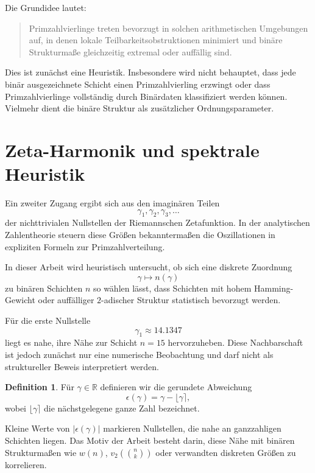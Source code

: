 \documentclass[11pt,a4paper,twocolumn]{article}
\theoremstyle{definition}
\newtheorem{definition}{Definition}
\theoremstyle{remark}
\begin{document}
	Die Grundidee lautet:
	\begin{quote}
		Primzahlvierlinge treten bevorzugt in solchen arithmetischen Umgebungen auf, in denen lokale Teilbarkeitsobstruktionen minimiert und binäre Strukturmaße gleichzeitig extremal oder auffällig sind.
	\end{quote}
	
	Dies ist zunächst eine Heuristik. Insbesondere wird nicht behauptet, dass jede binär ausgezeichnete Schicht einen Primzahlvierling erzwingt oder dass Primzahlvierlinge vollständig durch Binärdaten klassifiziert werden können. Vielmehr dient die binäre Struktur als zusätzlicher Ordnungsparameter.
	
	\section{Zeta-Harmonik und spektrale Heuristik}
	Ein zweiter Zugang ergibt sich aus den imaginären Teilen
	\[
	\gamma_1,\gamma_2,\gamma_3,\dots
	\]
	der nichttrivialen Nullstellen der Riemannschen Zetafunktion. In der analytischen Zahlentheorie steuern diese Größen bekanntermaßen die Oszillationen in expliziten Formeln zur Primzahlverteilung.
	
	In dieser Arbeit wird heuristisch untersucht, ob sich eine diskrete Zuordnung
	\[
	\gamma \longmapsto n(\gamma)
	\]
	zu binären Schichten $n$ so wählen lässt, dass Schichten mit hohem Hamming-Gewicht oder auffälliger $2$-adischer Struktur statistisch bevorzugt werden.
	
	Für die erste Nullstelle
	\[
	\gamma_1 \approx 14.1347
	\]
	liegt es nahe, ihre Nähe zur Schicht $n=15$ hervorzuheben. Diese Nachbarschaft ist jedoch zunächst nur eine numerische Beobachtung und darf nicht als struktureller Beweis interpretiert werden.
	
	\begin{definition}
		Für $\gamma\in\mathbb{R}$ definieren wir die gerundete Abweichung
		\begin{equation}
			\epsilon(\gamma)=\gamma-\lfloor \gamma \rceil,
		\end{equation}
		wobei $\lfloor \gamma \rceil$ die nächstgelegene ganze Zahl bezeichnet.
	\end{definition}
	
	Kleine Werte von $|\epsilon(\gamma)|$ markieren Nullstellen, die nahe an ganzzahligen Schichten liegen. Das Motiv der Arbeit besteht darin, diese Nähe mit binären Strukturmaßen wie $w(n)$, $v_2\!\left(\binom{n}{k}\right)$ oder verwandten diskreten Größen zu korrelieren.
	
\end{document}
